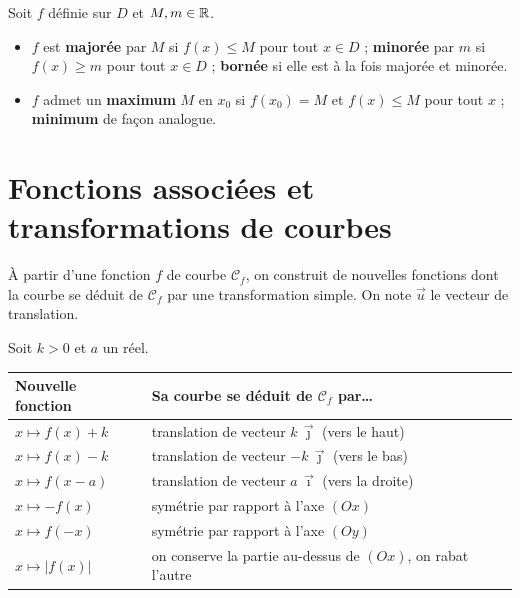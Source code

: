 \begin{definition}
Soit $f$ définie sur $D$ et $M,m\in\mathbb{R}$.
\begin{itemize}
  \item $f$ est \textbf{majorée} par $M$ si $f(x)\le M$ pour tout $x\in D$ ;
        \textbf{minorée} par $m$ si $f(x)\ge m$ pour tout $x\in D$ ; \textbf{bornée}
        si elle est à la fois majorée et minorée.
  \item $f$ admet un \textbf{maximum} $M$ en $x_0$ si $f(x_0)=M$ et $f(x)\le M$ pour
        tout $x$ ; \textbf{minimum} de façon analogue.
\end{itemize}
\end{definition}

\section{Fonctions associées et transformations de courbes}

À partir d'une fonction $f$ de courbe $\mathcal{C}_f$, on construit de nouvelles
fonctions dont la courbe se déduit de $\mathcal{C}_f$ par une transformation simple.
On note $\vec{u}$ le vecteur de translation.

\begin{propriete}
Soit $k>0$ et $a$ un réel.
\begin{center}\renewcommand{\arraystretch}{1.35}
\begin{tabular}{@{}l l@{}}
\toprule
\textbf{Nouvelle fonction} & \textbf{Sa courbe se déduit de $\mathcal{C}_f$ par\dots} \\
\midrule
$x\mapsto f(x)+k$   & translation de vecteur $k\,\vec{\jmath}$ (vers le haut) \\
$x\mapsto f(x)-k$   & translation de vecteur $-k\,\vec{\jmath}$ (vers le bas) \\
$x\mapsto f(x-a)$   & translation de vecteur $a\,\vec{\imath}$ (vers la droite) \\
$x\mapsto -f(x)$    & symétrie par rapport à l'axe $(Ox)$ \\
$x\mapsto f(-x)$    & symétrie par rapport à l'axe $(Oy)$ \\
$x\mapsto |f(x)|$   & on conserve la partie au-dessus de $(Ox)$, on rabat l'autre \\
\bottomrule
\end{tabular}
\end{center}
\end{propriete}

